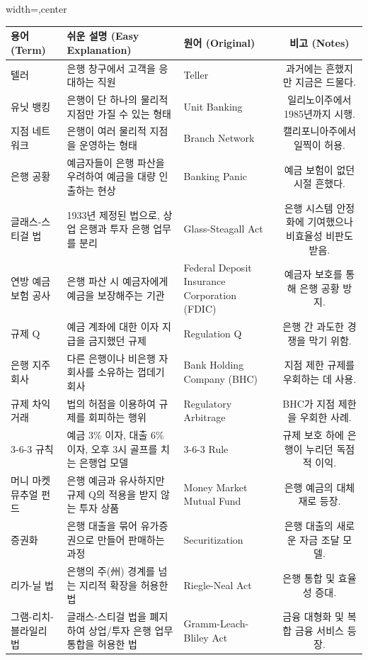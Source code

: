 \documentclass[11pt,a4paper]{article}
\theoremstyle{definition}
\begin{document}
\begin{adjustbox}{width=\textwidth,center}
\begin{tabular}{lllc}
\toprule
\textbf{용어 (Term)} & \textbf{쉬운 설명 (Easy Explanation)} & \textbf{원어 (Original)} & \textbf{비고 (Notes)} \\
\midrule
텔러 & 은행 창구에서 고객을 응대하는 직원 & Teller & 과거에는 흔했지만 지금은 드물다. \\
유닛 뱅킹 & 은행이 단 하나의 물리적 지점만 가질 수 있는 형태 & Unit Banking & 일리노이주에서 1985년까지 시행. \\
지점 네트워크 & 은행이 여러 물리적 지점을 운영하는 형태 & Branch Network & 캘리포니아주에서 일찍이 허용. \\
은행 공황 & 예금자들이 은행 파산을 우려하여 예금을 대량 인출하는 현상 & Banking Panic & 예금 보험이 없던 시절 흔했다. \\
글래스-스티걸 법 & 1933년 제정된 법으로, 상업 은행과 투자 은행 업무를 분리 & Glass-Steagall Act & 은행 시스템 안정화에 기여했으나 비효율성 비판도 받음. \\
연방 예금 보험 공사 & 은행 파산 시 예금자에게 예금을 보장해주는 기관 & Federal Deposit Insurance Corporation (FDIC) & 예금자 보호를 통해 은행 공황 방지. \\
규제 Q & 예금 계좌에 대한 이자 지급을 금지했던 규제 & Regulation Q & 은행 간 과도한 경쟁을 막기 위함. \\
은행 지주 회사 & 다른 은행이나 비은행 자회사를 소유하는 껍데기 회사 & Bank Holding Company (BHC) & 지점 제한 규제를 우회하는 데 사용. \\
규제 차익 거래 & 법의 허점을 이용하여 규제를 회피하는 행위 & Regulatory Arbitrage & BHC가 지점 제한을 우회한 사례. \\
3-6-3 규칙 & 예금 3\% 이자, 대출 6\% 이자, 오후 3시 골프를 치는 은행업 모델 & 3-6-3 Rule & 규제 보호 하에 은행이 누리던 독점적 이익. \\
머니 마켓 뮤추얼 펀드 & 은행 예금과 유사하지만 규제 Q의 적용을 받지 않는 투자 상품 & Money Market Mutual Fund & 은행 예금의 대체재로 등장. \\
증권화 & 은행 대출을 묶어 유가증권으로 만들어 판매하는 과정 & Securitization & 은행 대출의 새로운 자금 조달 모델. \\
리가-닐 법 & 은행의 주(州) 경계를 넘는 지리적 확장을 허용한 법 & Riegle-Neal Act & 은행 통합 및 효율성 증대. \\
그램-리치-블라일리 법 & 글래스-스티걸 법을 폐지하여 상업/투자 은행 업무 통합을 허용한 법 & Gramm-Leach-Bliley Act & 금융 대형화 및 복합 금융 서비스 등장. \\

\end{tabular}
\end{adjustbox}
\end{document}
